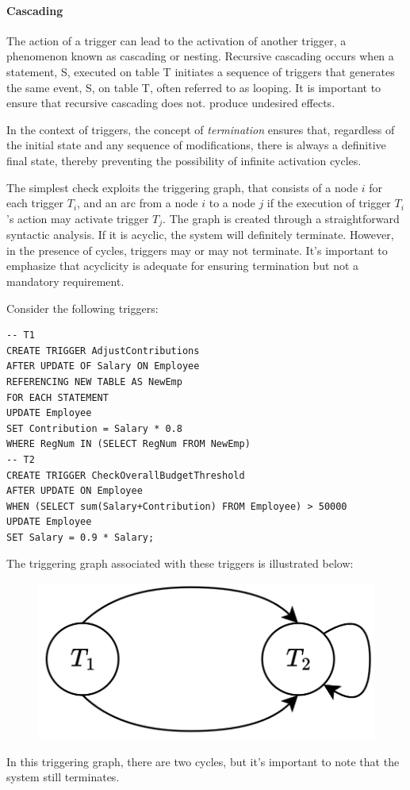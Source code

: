 \paragraph*{Cascading}
The action of a trigger can lead to the activation of another trigger, a phenomenon known as cascading or nesting.
Recursive cascading occurs when a statement, S, executed on table T initiates a sequence of triggers that generates the same event, S, on table T, often referred to as looping.
It is important to ensure that recursive cascading does not. produce undesired effects. 
\begin{definition}
    In the context of triggers, the concept of \emph{termination} ensures that, regardless of the initial state and any sequence of modifications, there is always a definitive final state, thereby preventing the possibility of infinite activation cycles.
\end{definition}
The simplest check exploits the triggering graph, that consists of a node $i$ for each trigger $T_i$, and an arc from a node $i$ to a node $j$ if the execution of trigger $T_i$'s action may activate trigger $T_j$.
The graph is created through a straightforward syntactic analysis. 
If it is acyclic, the system will definitely terminate. 
However, in the presence of cycles, triggers may or may not terminate. 
It's important to emphasize that acyclicity is adequate for ensuring termination but not a mandatory requirement.
\begin{example}
    Consider the following triggers:
    \begin{lstlisting}[style=SQL]
-- T1
CREATE TRIGGER AdjustContributions
AFTER UPDATE OF Salary ON Employee
REFERENCING NEW TABLE AS NewEmp
FOR EACH STATEMENT
UPDATE Employee
SET Contribution = Salary * 0.8
WHERE RegNum IN (SELECT RegNum FROM NewEmp)
-- T2
CREATE TRIGGER CheckOverallBudgetThreshold
AFTER UPDATE ON Employee
WHEN (SELECT sum(Salary+Contribution) FROM Employee) > 50000
UPDATE Employee
SET Salary = 0.9 * Salary; 
    \end{lstlisting}
    The triggering graph associated with these triggers is illustrated below:
    \begin{figure}[H]
        \centering
        \includegraphics[width=0.25\linewidth]{images/trig.png}
    \end{figure}
    In this triggering graph, there are two cycles, but it's important to note that the system still terminates.
\end{example}